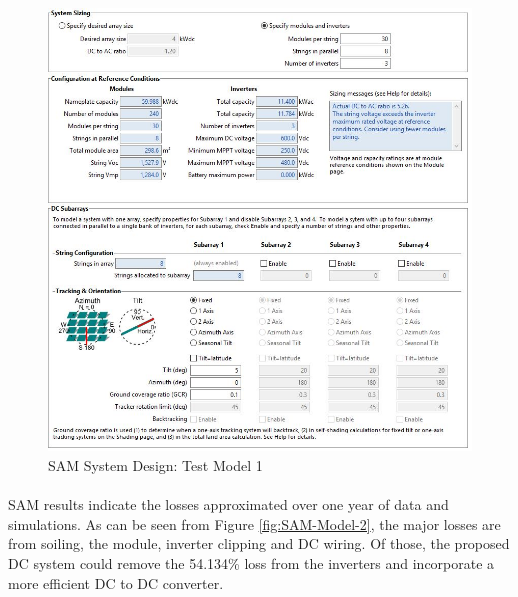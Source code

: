 \begin{figure}[H]
\hfill\includegraphics[width = 120mm]{images/sam-1-system-design}\hspace*{\fill}
\caption{SAM System Design: Test Model 1} 
\label{fig:SAM-Model-1}
\end{figure}      

\paragraph{}
SAM results indicate the losses approximated over one year of data and simulations. As can be seen from Figure \ref{fig:SAM-Model-2}, the major losses are from soiling, the module, inverter clipping and DC wiring. Of those, the proposed DC system could remove the 54.134\% loss from the inverters and incorporate a more efficient DC to DC converter.   

